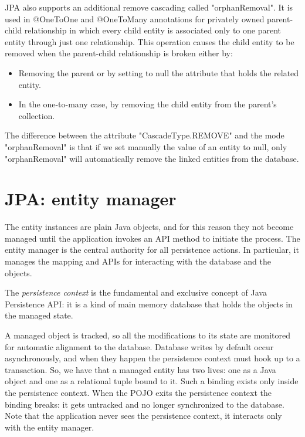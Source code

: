 \documentclass[12pt, a4paper]{report}
\begin{document}
    JPA also supports an additional remove cascading called "orphanRemoval". It is used in @OneToOne and @OneToMany annotations for privately 
    owned parent-child relationship in which every child entity is associated only to one parent entity through just one relationship. This operation 
    causes the child entity to be removed when the parent-child relationship is broken either by: 
    \begin{itemize}
        \item Removing the parent or by setting to null the attribute that holds the related entity. 
        \item In the one-to-many case, by removing the child entity from the parent's collection.
    \end{itemize}
    The difference between the attribute "CascadeType.REMOVE" and the mode "orphanRemoval" is that if we set manually the value of an entity to null, 
    only "orphanRemoval" will automatically remove the linked entities from the database. 

  
    \section{JPA: entity manager}
    The entity instances are plain Java objects, and for this reason they not become managed until the application invokes an API method to initiate the process. The
    entity manager is the central authority for all persistence actions. In particular, it manages the mapping and APIs for interacting with the database and the objects. 
    \begin{definition}
        The \emph{persistence context} is the fundamental and exclusive concept of Java Persistence API: it is a kind of main memory database that holds the objects in 
        the managed state. 
    \end{definition}
    A managed object is tracked, so all the modifications to its state are monitored for automatic alignment to the database. 
    Database writes by default occur asynchronously, and when they happen the persistence context must hook up to a transaction. So, we have that a managed entity has two 
    lives: one as a Java object and one as a relational tuple bound to it. Such a binding exists only inside the persistence context. When the POJO exits the persistence 
    context the binding breaks: it gets untracked and no longer synchronized to the database. Note that the application never sees the persistence context, it interacts
    only with the entity manager.
\end{document}
